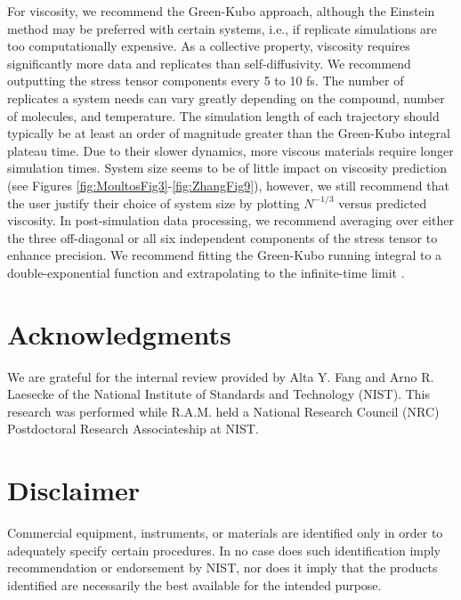 \documentclass[9pt,bestpractices]{livecoms}
\begin{document}
For viscosity, we recommend the Green-Kubo approach, although the Einstein method may be preferred with certain systems, i.e., if replicate simulations are too computationally expensive. As a collective property, viscosity requires significantly more data and replicates than self-diffusivity. We recommend outputting the stress tensor components every 5 to 10 fs. The number of replicates a system needs can vary greatly depending on the compound, number of molecules, and temperature. The simulation length of each trajectory should typically be at least an order of magnitude greater than the Green-Kubo integral plateau time. Due to their slower dynamics, more viscous materials require longer simulation times. System size seems to be of little impact on viscosity prediction (see Figures \ref{fig:MoultosFig3}-\ref{fig:ZhangFig9}), however, we still recommend that the user justify their choice of system size by plotting $N^{-1/3}$ versus predicted viscosity. In post-simulation data processing, we recommend averaging over either the three off-diagonal or all six independent components of the stress tensor to enhance precision.  We recommend fitting the Green-Kubo running integral to a double-exponential function and extrapolating to the infinite-time limit \cite{Zhang2015}.



\section*{Acknowledgments}

We are grateful for the internal review provided by Alta Y. Fang and Arno R. Laesecke of the National Institute of Standards and Technology (NIST). This research was performed while R.A.M. held a National Research Council (NRC) Postdoctoral Research Associateship at NIST.

\section*{Disclaimer}

Commercial equipment, instruments, or materials are identified only in order to adequately specify certain procedures. In no case does such identification imply recommendation or endorsement by NIST, nor does it imply that the products identified are necessarily the best available for the intended purpose.



\end{document}
